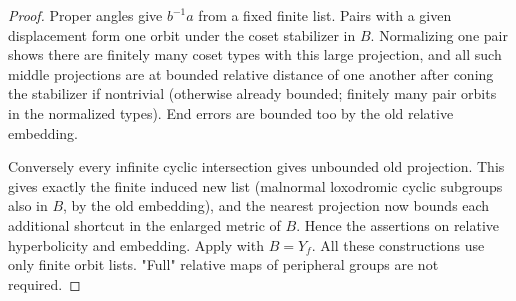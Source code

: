 \begin{proof}
Proper angles give \(b^{-1}a\) from a fixed finite list. Pairs with a given displacement form one orbit under the coset stabilizer in \(B\). Normalizing one pair shows there are finitely many coset types with this large projection, and all such middle projections are at bounded relative distance of one another after coning the stabilizer if nontrivial (otherwise already bounded; finitely many pair orbits in the normalized types). End errors are bounded too by the old relative embedding.

Conversely every infinite cyclic intersection gives unbounded old projection. This gives exactly the finite induced new list (malnormal loxodromic cyclic subgroups also in \(B\), by the old embedding), and the nearest projection now bounds each additional shortcut in the enlarged metric of \(B\). Hence the assertions on relative hyperbolicity and embedding. Apply with \(B=Y_f\). All these constructions use only finite orbit lists. "Full" relative maps of peripheral groups are not required.

\end{proof}

